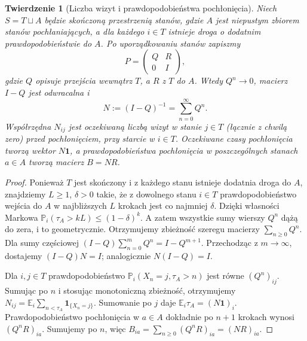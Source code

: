 \documentclass[11pt,a4paper,oneside]{report}
\numberwithin{equation}{chapter}
\theoremstyle{plain}
\newtheorem{twierdzenie}{Twierdzenie}[chapter]
\theoremstyle{definition}
\theoremstyle{remark}
\newcommand{\Prob}{\mathbb{P}}
\newcommand{\E}{\mathbb{E}}
\newcommand{\ind}[1]{\mathbf{1}_{#1}}
\begin{document}
\begin{twierdzenie}[Liczba wizyt i prawdopodobieństwa pochłonięcia]
Niech $S=T\sqcup A$ będzie skończoną przestrzenią
stanów, gdzie $A$ jest niepustym zbiorem stanów
pochłaniających, a dla każdego $i\in T$ istnieje
droga o dodatnim prawdopodobieństwie do $A$.
Po uporządkowaniu stanów zapiszmy
\[
P=\begin{pmatrix}Q&R\\0&I\end{pmatrix},
\]
gdzie $Q$ opisuje przejścia wewnątrz $T$,
a $R$ z $T$ do $A$. Wtedy $Q^n\to0$, macierz
$I-Q$ jest odwracalna i
\[
N:=(I-Q)^{-1}=\sum_{n=0}^{\infty}Q^n.
\]
Współrzędna $N_{ij}$ jest oczekiwaną liczbą
wizyt w stanie $j\in T$ (łącznie z chwilą zero)
przed pochłonięciem, przy starcie w $i\in T$.
Oczekiwane czasy pochłonięcia tworzą wektor
$N\mathbf 1$, a prawdopodobieństwa pochłonięcia
w poszczególnych stanach $a\in A$ tworzą
macierz $B=NR$.
\end{twierdzenie}
\begin{proof}
Ponieważ $T$ jest skończony i z każdego stanu
istnieje dodatnia droga do $A$, znajdziemy
$L\geq1$, $\delta>0$ takie, że z dowolnego
stanu $i\in T$ prawdopodobieństwo wejścia do $A$
w najbliższych $L$ krokach jest co najmniej
$\delta$. Dzięki własności Markowa
$\Prob_i(\tau_A>kL)\leq(1-\delta)^k$.
A zatem wszystkie sumy wierszy $Q^n$ dążą do zera,
i to geometrycznie. Otrzymujemy zbieżność
szeregu macierzy $\sum_{n\geq0}Q^n$.
Dla sumy częściowej
$(I-Q)\sum_{n=0}^{m}Q^n=I-Q^{m+1}$.
Przechodząc z $m\to\infty$, dostajemy
$(I-Q)N=I$; analogicznie $N(I-Q)=I$.

Dla $i,j\in T$ prawdopodobieństwo
$\Prob_i(X_n=j,\tau_A>n)$ jest równe
$(Q^n)_{ij}$. Sumując po $n$ i stosując
monotoniczną zbieżność, otrzymujemy
$N_{ij}=\E_i\sum_{n<\tau_A}\ind{\{X_n=j\}}$.
Sumowanie po $j$ daje
$\E_i\tau_A=(N\mathbf 1)_i$.
Prawdopodobieństwo pochłonięcia w $a\in A$
dokładnie po $n+1$ krokach wynosi
$(Q^nR)_{ia}$. Sumujemy po $n$, więc
$B_{ia}=\sum_{n\geq0}(Q^nR)_{ia}=(NR)_{ia}$.
\end{proof}
\end{document}
